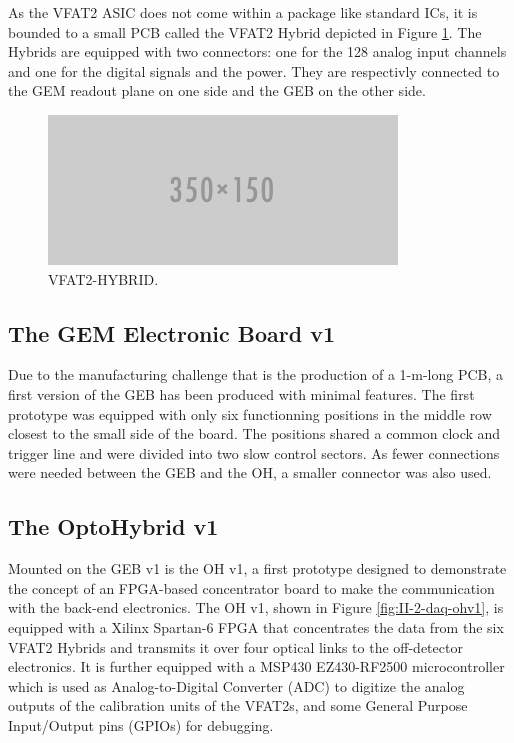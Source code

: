       As the VFAT2 ASIC does not come within a package like standard ICs, it is bounded to a small PCB called the VFAT2 Hybrid depicted in Figure \ref{fig:II-2-daq-vfat2-hybrid}. The Hybrids are equipped with two connectors: one for the 128 analog input channels and one for the digital signals and the power. They are respectivly connected to the GEM readout plane on one side and the GEB on the other side.

      \begin{figure}[h!]
        \centering
        \includegraphics[width=\textwidth]{img/empty.png}
        \caption{VFAT2-HYBRID.}
        \label{fig:II-2-daq-vfat2-hybrid}
      \end{figure}

    \subsection{The GEM Electronic Board v1}

      Due to the manufacturing challenge that is the production of a 1-m-long PCB, a first version of the GEB has been produced with minimal features. The first prototype was equipped with only six functionning positions in the middle row closest to the small side of the board. The positions shared a common clock and trigger line and were divided into two slow control sectors. As fewer connections were needed between the GEB and the OH, a smaller connector was also used.

    \subsection{The OptoHybrid v1}

      Mounted on the GEB v1 is the OH v1, a first prototype designed to demonstrate the concept of an FPGA-based concentrator board to make the communication with the back-end electronics. The OH v1, shown in Figure \ref{fig:II-2-daq-ohv1}, is equipped with a Xilinx Spartan-6 FPGA that concentrates the data from the six VFAT2 Hybrids and transmits it over four optical links to the off-detector electronics. It is further equipped with a MSP430 EZ430-RF2500 \cite{MSP430} microcontroller which is used as Analog-to-Digital Converter (ADC) to digitize the analog outputs of the calibration units of the VFAT2s, and some General Purpose Input/Output pins (GPIOs) for debugging.

